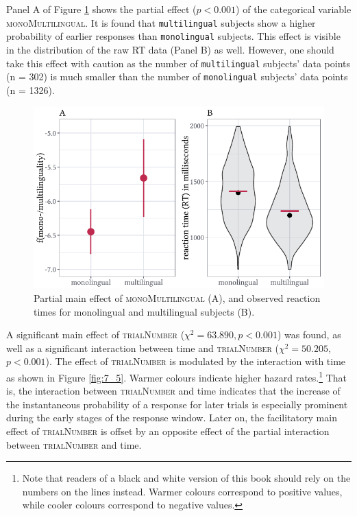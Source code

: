 Panel A of Figure \ref{fig:7_4} shows the partial effect ($p<0.001$) of the categorical variable \textsc{monoMultilingual}. It is found that \texttt{multilingual} subjects show a higher probability of earlier responses than \texttt{monolingual} subjects. This effect is visible in the distribution of the raw RT data (Panel B) as well. However, one should take this effect with caution as the number of \texttt{multilingual} subjects’ data points (n = 302) is much smaller than the number of \texttt{monolingual} subjects’ data points (n = 1326). 

\begin{figure}
    \centering
    \includegraphics[]{figures/fig7.4.pdf}
    \caption{Partial main effect of \textsc{monoMultilingual} (A), and observed reaction times for monolingual and multilingual subjects (B).}
    \label{fig:7_4}
\end{figure}

A significant main effect of \textsc{trialNumber} ($χ^{2}=63.890, p<0.001$) was found, as well as a significant interaction between time and \textsc{trialNumber} ($χ^{2}=50.205,$ $p<0.001$). The effect of \textsc{trialNumber} is modulated by the interaction with time as shown in Figure \ref{fig:7_5}. Warmer colours indicate higher hazard rates.\footnote{Note that readers of a black and white version of this book should rely on the numbers on the lines instead. Warmer colours correspond to positive values, while cooler colours correspond to negative values.} That is, the interaction between \textsc{trialNumber} and time indicates that the increase of the instantaneous probability of a response for later trials is especially prominent during the early stages of the response window. Later on, the facilitatory main effect of \textsc{trialNumber} is offset by an opposite effect of the partial interaction between \textsc{trialNumber} and time.

